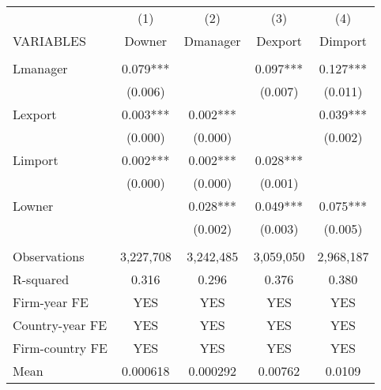 \begin{tabular}{lcccc} \hline
 & (1) & (2) & (3) & (4) \\
VARIABLES & Downer & Dmanager & Dexport & Dimport \\ \hline
 &  &  &  &  \\
Lmanager & 0.079*** &  & 0.097*** & 0.127*** \\
 & (0.006) &  & (0.007) & (0.011) \\
Lexport & 0.003*** & 0.002*** &  & 0.039*** \\
 & (0.000) & (0.000) &  & (0.002) \\
Limport & 0.002*** & 0.002*** & 0.028*** &  \\
 & (0.000) & (0.000) & (0.001) &  \\
Lowner &  & 0.028*** & 0.049*** & 0.075*** \\
 &  & (0.002) & (0.003) & (0.005) \\
 &  &  &  &  \\
Observations & 3,227,708 & 3,242,485 & 3,059,050 & 2,968,187 \\
R-squared & 0.316 & 0.296 & 0.376 & 0.380 \\
Firm-year FE & YES & YES & YES & YES \\
Country-year FE & YES & YES & YES & YES \\
Firm-country FE & YES & YES & YES & YES \\
 Mean & 0.000618 & 0.000292 & 0.00762 & 0.0109 \\ \hline
\end{tabular}
